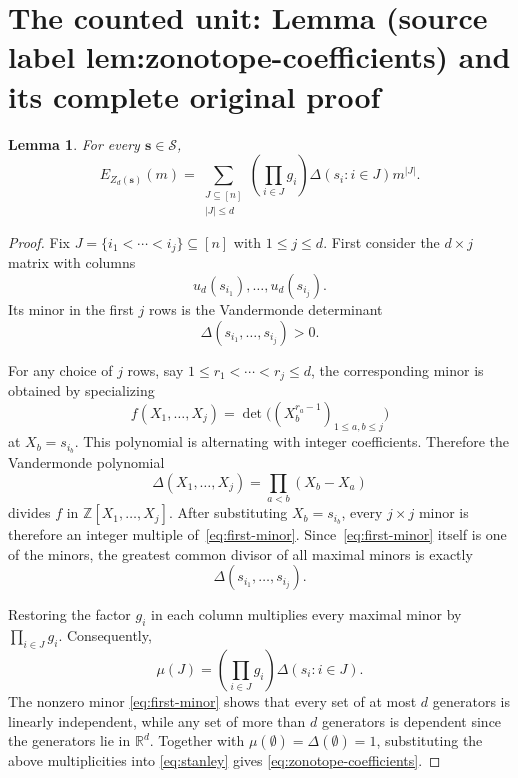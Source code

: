 \documentclass[10pt,a4paper]{amsart}
\newcommand{\RR}{\mathbb{R}}
\newcommand{\Sc}{\mathcal{S}}
\newcommand{\ZZ}{\mathbb{Z}}
\theoremstyle{plain}
\newtheorem{lem}[thm]{Lemma}
\theoremstyle{definition}
\theoremstyle{remark}
\begin{document}
\section{The counted unit: Lemma (source label lem:zonotope-coefficients) and its complete original proof}

\begin{lem}\label{lem:zonotope-coefficients}
For every $\mathbf s\in\Sc$,
\begin{equation}\label{eq:zonotope-coefficients}
    E_{Z_d(\mathbf s)}(m)= \sum_{\substack{J\subseteq[n]\\|J|\le d}} \left(\prod_{i\in J}g_i\right) \Delta(s_i:i\in J)m^{|J|}.
\end{equation}
\end{lem}

\begin{proof}
Fix $J=\{i_1<\cdots<i_j\}\subseteq[n]$ with $1\le j\le d$. First consider the $d\times j$ matrix with columns
\[
u_d(s_{i_1}),\ldots,u_d(s_{i_j}).
\]
Its minor in the first $j$ rows is the Vandermonde determinant
\begin{equation}\label{eq:first-minor}
    \Delta(s_{i_1},\ldots,s_{i_j})>0.
\end{equation}

For any choice of $j$ rows, say $1\le r_1<\cdots<r_j\le d$, the corresponding minor is obtained by specializing
\[
f(X_1,\ldots,X_j)=\det\bigl((X_b^{r_a-1})_{1\le a,b\le j}\bigr)
\]
at $X_b = s_{i_b}$. This polynomial is alternating with integer coefficients. Therefore the Vandermonde polynomial
\[
\Delta(X_1,\ldots,X_j)=\prod_{a<b}(X_b-X_a)
\]
divides $f$ in $\ZZ[X_1,\ldots,X_j]$. After substituting $X_b=s_{i_b}$, every $j\times j$ minor is therefore an integer multiple of~\eqref{eq:first-minor}. Since~\eqref{eq:first-minor} itself is one of the minors, the greatest common divisor of all maximal minors is exactly
\[
\Delta(s_{i_1},\ldots,s_{i_j}).
\]

Restoring the factor $g_i$ in each column multiplies every maximal minor by $\prod_{i\in J}g_i$. Consequently,
\[
\mu(J)=\left(\prod_{i\in J}g_i\right)\Delta(s_i:i\in J).
\]
The nonzero minor \eqref{eq:first-minor} shows that every set of at most $d$ generators is linearly independent, while any set of more than $d$ generators is dependent since the generators lie in $\RR^d$. Together with $\mu(\emptyset)=\Delta(\emptyset)=1$, substituting the above multiplicities into \eqref{eq:stanley} gives \eqref{eq:zonotope-coefficients}.
\end{proof}
\end{document}

